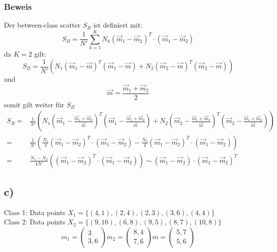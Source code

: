\documentclass[a4paper,parskip=full-]{article}
\begin{document}
\subsubsection{Beweis}
Der  between-class scatter $S_B$ ist definiert mit:
$$
S_B = \frac{1}{N'} \sum^K_{k=1} N_k  \left( \vec{m}_1 - \vec{m}_2 \right)^T \cdot (\vec{m}_1 - \vec{m}_2)
$$
da $K=2$ gilt:
$$
S_B = \frac{1}{N'} \left( N_1 (\vec{m}_1 - \vec{m})^T (\vec{m}_1 - \vec{m}) + 
N_2 (\vec{m}_2 - \vec{m})^T (\vec{m}_2 - \vec{m})  \right)
$$
und 
$$
\vec{m} = \frac{\vec{m}_1 + \vec{m}_2}{2}
$$
somit gilt weiter für $S_B$
\begin{equation*}
\begin{aligned}
S_B = & \frac{1}{N'} 
\left( 
N_1 (\vec{m}_1 - \frac{\vec{m}_1 + \vec{m}_2}{\vec{m}})^T (\vec{m}_1 - \frac{\vec{m}_1 + \vec{m}_2}{\vec{m}}) + 
N_2 (\vec{m}_2 - \frac{\vec{m}_1 + \vec{m}_2}{\vec{m}})^T (\vec{m}_2 - \frac{\vec{m}_1 + \vec{m}_2}{\vec{m}})  
\right) \\
= & \frac{1}{N'} \left(
\frac{N_1}{4} \left( \vec{m}_1 - \vec{m}_2 \right)^T \cdot (\vec{m}_1 - \vec{m}_2) - 
\frac{N_2}{4} \left( \vec{m}_1 - \vec{m}_2 \right)^T \cdot (\vec{m}_1 - \vec{m}_2)
\right) \\
= & \frac{N_1 - N_2}{4 N'} 
\left(
\left(\vec{m}_1 - \vec{m}_2 \right)^T \cdot (\vec{m}_1 - \vec{m}_2)
\right)
\sim (\vec{m}_1 - \vec{m}_2) \cdot \left( \vec{m}_1 - \vec{m}_2 \right)^T
\end{aligned}
\end{equation*}

\subsection{c)}
Class 1: Data points $X_1 = \{(4,1),(2,4),(2,3),(3,6),(4,4) \}$ \\
Class 2: Data points $X_2 = \{(9,10),(6,8),(9,5),(8,7),(10,8) \}$ \\

$$
m_1 = 
\begin{pmatrix}
3 \\ 3,6
\end{pmatrix}
m_2 = \begin{pmatrix}
8,4 \\ 7,6
\end{pmatrix}
m = \begin{pmatrix}
5,7 \\ 5,6
\end{pmatrix}
$$
\end{document}
